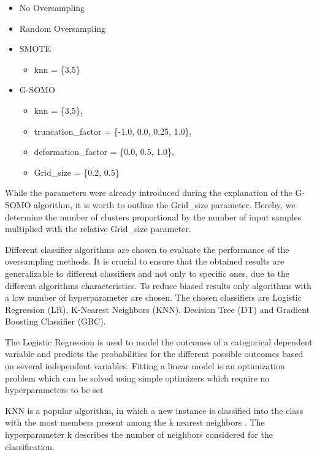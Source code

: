 \documentclass[parskip=full]{scrartcl}
\begin{document}
\begin{itemize}
  \item No Oversampling
  \item Random Oversampling 
  \item SMOTE 
    \begin{itemize}
 \item knn = \{3,5\}
 \end{itemize}
  \item G-SOMO 
  \begin{itemize}
 \item knn = \{3,5\},
 \item truncation\_factor = \{-1.0, 0.0, 0.25, 1.0\},
 \item deformation\_factor = \{0.0, 0.5, 1.0\},
 \item Grid\_size = \{0.2, 0.5\}
 \end{itemize}
\end{itemize}

While the parameters were already introduced during the explanation of the G-SOMO algorithm, it is worth to outline the Grid\_size parameter. Hereby, we determine the number of clusters proportional by the number of input samples multiplied with the relative Grid\_size parameter.

Different classifier algorithms are chosen to evaluate the performance of the oversampling methods. It is crucial to ensure that the obtained results are generalizable to different classifiers and not only to specific ones, due to the different algorithms characteristics. To reduce biased results only algorithms with a low number of hyperparameter are chosen. The chosen classifiers are Logistic Regression (LR), K-Nearest Neighbors (KNN), Decision Tree (DT) and Gradient Boosting Classifier (GBC).

The Logistic Regression is used to model the outcomes of a categorical dependent variable and predicts the probabilities for the different possible outcomes based on several independent variables.  Fitting a linear model is an optimization problem which can be solved using simple optimizers which require no hyperparameters to be set \cite{McCullagh1984}

KNN is a popular algorithm, in which a new instance is classified into the class with the most members present among the k nearest neighbors \cite{Suguna2010}. The hyperparameter k describes the number of neighbors considered for the classification.
\end{document}
